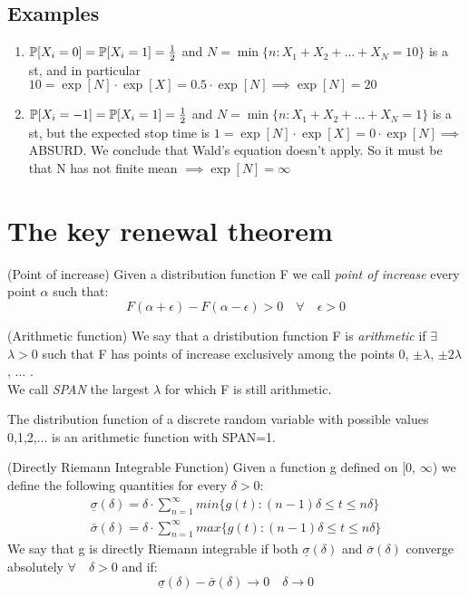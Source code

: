 \subsection{Examples}
	\begin{enumerate}
		\item $\mathbb{P}[X_i=0]=\mathbb{P}[X_i = 1] = \frac{1}{2}$ and $N = \min\{n : X_1 + X_2 + \dots + X_N =10\}$ is a \gls{st}, and in particular
		$10 = \exp[N] \cdot \exp[X] = 0.5 \cdot \exp[N] \implies \exp[N]=20$
		\item $\mathbb{P}[X_i=-1]=\mathbb{P}[X_i = 1] = \frac{1}{2}$ and $N = \min\{n : X_1 + X_2 + \dots + X_N =1\}$ is a \gls{st}, but the expected stop time
		is $1 = \exp[N] \cdot \exp[X] = 0 \cdot \exp[N] \implies $ ABSURD. We conclude that Wald's equation doesn't apply. So it must be that N has not finite mean $\implies \exp[N]=\infty$
	\end{enumerate}

\section{The key renewal theorem}
\begin{definition}
	(Point of increase) Given a distribution function F we call \textit{point of increase} every point $\alpha$ such that:
	\begin{equation}
		F(\alpha+\epsilon)-F(\alpha-\epsilon)>0 \quad  \forall \quad
		\epsilon > 0
	\end{equation}
\end{definition}
\begin{definition}
	(Arithmetic function) We say that a dristibution function F is \textit{arithmetic} if $\exists$ $\lambda > 0$ such that F has points of increase exclusively among the points 0, $\pm \lambda$, $\pm 2\lambda$, ... . \\
	We call \textit{SPAN} the largest $\lambda$ for which F is still arithmetic.
\end{definition}

The distribution function of a discrete random variable with possible values 0,1,2,... is an arithmetic function with SPAN=1.

\begin{definition}
	(Directly Riemann Integrable Function) Given a function g defined on [0, $\infty$) we define the following quantities for every $\delta > 0$:
	\begin{align*}
		\underline \sigma (\delta) = \delta \cdot \sum_{n=1}^{\infty} min\{g(t):(n-1)\delta \leq t \leq n \delta \}
		\\
		\bar \sigma (\delta) = \delta \cdot \sum_{n=1}^{\infty}max\{g(t):(n-1)\delta \leq t \leq n \delta \}
	\end{align*}
	We say that g is directly Riemann integrable if both $\underline \sigma (\delta)$ and $\bar \sigma (\delta)$ converge absolutely $\forall \quad \delta > 0$ and if:
	\begin{equation}
		\underline \sigma (\delta) - \bar \sigma (\delta) \rightarrow 0 \quad \delta \rightarrow 0
		\end{equation}
\end{definition}

